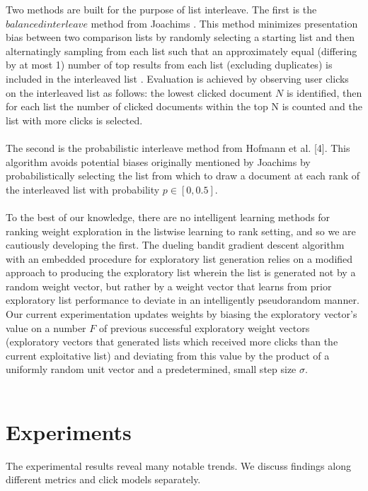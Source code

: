 \documentclass{acm_proc_article-sp}
\begin{document}
Two methods are built for the purpose of list interleave. The first is the $balanced interleave$ method from Joachims \cite{joachims}. This method minimizes presentation bias between two comparison lists by randomly selecting a starting list and then alternatingly sampling from each list such that an approximately equal (differing by at most 1) number of top results from each list (excluding duplicates) is included in the interleaved list \cite{Joachims}. Evaluation is achieved by observing user clicks on the interleaved list as follows: the lowest clicked document $N$ is identified, then for each list the number of clicked documents within the top N is counted and the list with more clicks is selected. \\ \\
The second is the probabilistic interleave method from Hofmann et al. [4]. This algorithm avoids potential biases originally mentioned by Joachims \cite{joachims} by probabilistically selecting the list from which to draw a document at each rank of the interleaved list with probability $p \in  [0, 0.5]$\cite{hofmann}. \\ \\
To the best of our knowledge, there are no intelligent learning methods for ranking weight exploration in the listwise learning to rank setting, and so we are cautiously developing the first. The dueling bandit gradient descent algorithm with an embedded procedure for exploratory list generation relies on a modified approach to producing the exploratory list wherein the list is generated not by a random weight vector, but rather by a weight vector that learns from prior exploratory list performance to deviate in an intelligently pseudorandom manner. Our current experimentation updates weights by biasing the exploratory vector’s value on a number $F$ of previous successful exploratory weight vectors (exploratory vectors that generated lists which received more clicks than the current exploitative list) and deviating from this value by the product of a uniformly random unit vector and a predetermined, small step size $\sigma$. \\ \\

\section{Experiments}
The experimental results reveal many notable trends.  We discuss findings along different metrics and click models separately.
\end{document}
